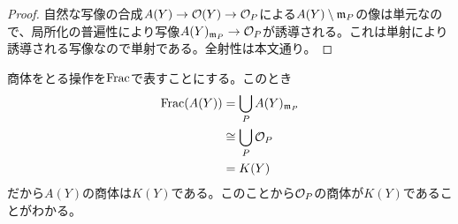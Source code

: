 \begin{proof}
自然な写像の合成$A(Y) \to \mathcal{O}(Y) \to \mathcal{O}_P$による$A(Y) \setminus \mathfrak{m}_P$の像は単元なので、局所化の普遍性により写像$A(Y)_{\mathfrak{m}_P} \to \mathcal{O}_P$が誘導される。これは単射により誘導される写像なので単射である。全射性は本文通り。
\end{proof}


\begin{rem}
商体をとる操作を$\operatorname{Frac}$で表すことにする。このとき
\begin{align*}
  \operatorname{Frac} (A(Y)) &= \bigcup_P A(Y)_{\mathfrak{m}_P} \\
  &\cong \bigcup_P \mathcal{O}_P \\
  &= K(Y)
\end{align*}
だから$A(Y)$の商体は$K(Y)$である。このことから$\mathcal{O}_P$の商体が$K(Y)$であることがわかる。
\end{rem}




